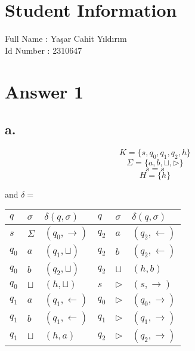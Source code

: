 \documentclass[12pt]{article}
\begin{document}
\section*{Student Information } 
Full Name : Yaşar Cahit Yıldırım \\
Id Number : 2310647              \\



\section*{Answer 1}

\subsection*{a.}
  \begin{minipage}{0.3\textwidth}
    $$K = \{s, q_0, q_1, q_2, h\}$$
    $$\Sigma = \{a, b, \sqcup, \triangleright\}$$
    $$s = s$$
    $$H = \{h\}$$
  \end{minipage}
  and $\delta = $ \hspace{0.15cm}
  \begin{minipage}{0.7\textwidth}
    \begin{table}[H]
      \begin{tabular}{|lll|lll|}
        \hline
        $q  $ & $\sigma$ & $\delta(q, \sigma) $ & $q  $ & $\sigma        $ & $\delta(q, \sigma) $ \\ \hline
        $s  $ & $\Sigma$ & $(q_0, \rightarrow)$ & $q_2$ & $a             $ & $(q_2, \leftarrow) $ \\
        $q_0$ & $a     $ & $(q_1, \sqcup)     $ & $q_2$ & $b             $ & $(q_2, \leftarrow) $ \\
        $q_0$ & $b     $ & $(q_2, \sqcup)     $ & $q_2$ & $\sqcup        $ & $(h, b)            $ \\
        $q_0$ & $\sqcup$ & $(h, \sqcup)       $ & $s  $ & $\triangleright$ & $(s, \rightarrow)  $ \\
        $q_1$ & $a     $ & $(q_1, \leftarrow) $ & $q_0$ & $\triangleright$ & $(q_0, \rightarrow)$ \\
        $q_1$ & $b     $ & $(q_1, \leftarrow) $ & $q_1$ & $\triangleright$ & $(q_1, \rightarrow)$ \\
        $q_1$ & $\sqcup$ & $(h, a)            $ & $q_2$ & $\triangleright$ & $(q_2, \rightarrow)$ \\ \hline
      \end{tabular}
    \end{table}
  \end{minipage}
\end{document}
